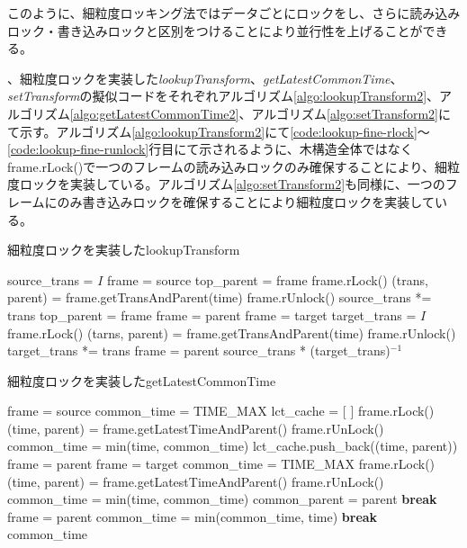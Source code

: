 \documentclass[a4paper]{jreport}	%
\begin{document}
このように、細粒度ロッキング法ではデータごとにロックをし、さらに読み込みロック・書き込みロックと区別をつけることにより並行性を上げることができる。

、細粒度ロックを実装した\textit{lookupTransform}、\textit{getLatestCommonTime}、\textit{setTransform}の擬似コードをそれぞれアルゴリズム\ref{algo:lookupTransform2}、アルゴリズム\ref{algo:getLatestCommonTime2}、アルゴリズム\ref{algo:setTransform2}にて示す。アルゴリズム\ref{algo:lookupTransform2}にて\ref{code:lookup-fine-rlock}〜\ref{code:lookup-fine-runlock}行目にて示されるように、木構造全体ではなくframe.rLock()で一つのフレームの読み込みロックのみ確保することにより、細粒度ロックを実装している。アルゴリズム\ref{algo:setTransform2}も同様に、一つのフレームにのみ書き込みロックを確保することにより細粒度ロックを実装している。

\begin{algorithm}
  \caption{細粒度ロックを実装したlookupTransform}\label{algo:lookupTransform2}
\begin{algorithmic}[1]
	\EndIf
	\State source\_trans = $I$
	\State frame = source
	\State top\_parent = frame
	\State frame.rLock() \label{code:lookup-fine-rlock}
	\State (trans, parent) = frame.getTransAndParent(time) 
	\State frame.rUnlock() \label{code:lookup-fine-runlock}
	\State source\_trans *= trans
	\State top\_parent = frame
	\State frame = parent
	\EndWhile
	\State frame = target
	\State target\_trans = $I$
	\State frame.rLock()
	\State (tarns, parent) = frame.getTransAndParent(time)
	\State frame.rUnlock()
	\State target\_trans *= trans
	\State frame = parent
	\EndWhile
	\State \Return source\_trans * (target\_trans)$^{-1}$
	\EndFunction
\end{algorithmic}
\end{algorithm}

\begin{algorithm}
\caption{細粒度ロックを実装したgetLatestCommonTime} \label{algo:getLatestCommonTime2}
\begin{algorithmic}[1]
	\State frame = source
	\State common\_time = TIME\_MAX
	\State lct\_cache = [ ] 
	\State frame.rLock()
	\State (time, parent) = frame.getLatestTimeAndParent()
	\State frame.rUnLock()
	\State common\_time = min(time, common\_time)
	\State lct\_cache.push\_back((time, parent))
	\State frame = parent
	\EndWhile
	\State frame = target
	\State common\_time = TIME\_MAX
	\State frame.rLock()
	\State (time, parent) = frame.getLatestTimeAndParent()
	\State frame.rUnLock()
	\State common\_time = min(time, common\_time)
	\State common\_parent = parent
	\State \textbf{break}
	\EndIf
	\State frame = parent
	\EndWhile
	\State common\_time = min(common\_time, time)
	\State \textbf{break}
	\EndIf
	\EndFor
	\State \Return common\_time
	\EndFunction
\end{algorithmic}
\end{algorithm}
\end{document}
